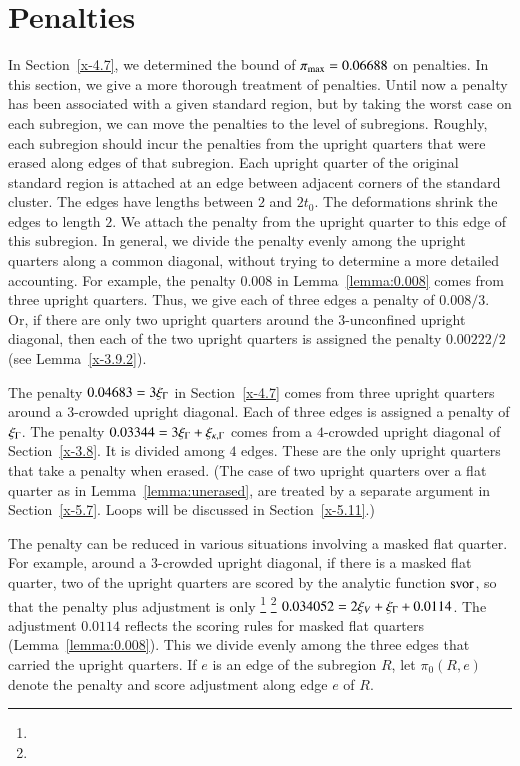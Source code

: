 \section{Penalties} %
    \label{sec:penalty1}

In Section~\ref{x-4.7}, we determined the bound of
$\pi_{\max}=0.06688$ on penalties. In this section, we give a more
thorough treatment of penalties. Until now a penalty has been
associated with a given standard region, but by taking the worst
case on each subregion, we can move the penalties to the level of
subregions.   Roughly, each subregion should incur the penalties
from the upright quarters that were erased along edges of that
subregion.  Each upright quarter of the original standard region
is attached at an edge between adjacent corners of the standard
cluster. The edges have lengths between $2$ and $2t_0$.  The
deformations shrink the edges to length $2$.  We attach the
penalty from the upright quarter to this edge of this subregion.
In general, we divide the penalty evenly among the upright
quarters along a common diagonal, without trying to determine a
more detailed accounting. For example, the penalty $0.008$ in
Lemma~\ref{lemma:0.008} comes from three upright quarters.  Thus,
we give each of three edges a penalty of $0.008/3$. Or, if there
are only two upright quarters around the $3$-unconfined upright
diagonal, then each of the two upright quarters is assigned the
penalty $0.00222/2$ (see Lemma~\ref{x-3.9.2}).

The penalty $0.04683 = 3\xi_\Gamma$ in Section~\ref{x-4.7} comes from
three upright quarters around a $3$-crowded upright diagonal. Each
of three edges is assigned a penalty of $\xi_\Gamma$.  The penalty
$0.03344=3\xi_\Gamma+\xi_{\kappa,\Gamma}$ comes from a $4$-crowded upright diagonal of
Section~\ref{x-3.8}. It is divided among $4$ edges. These are the
only upright quarters that take a penalty when erased. (The case
of two upright quarters over a flat quarter as in
Lemma~\ref{lemma:unerased}, are treated by a separate argument in
Section~\ref{x-5.7}. Loops will be discussed in
Section~\ref{x-5.11}.)

The penalty can be reduced in various situations involving a
masked flat quarter.  For example, around a $3$-crowded upright
diagonal, if there is a masked flat quarter, two of the upright
quarters are scored by the analytic  function $\operatorname{svor}$, so that the
penalty plus adjustment is only%
\footnote{} %
\footnote{} %
 $0.034052=2\xi_V+\xi_\Gamma+0.0114$.
The adjustment $0.0114$ reflects the scoring
rules for masked flat quarters (Lemma~\ref{lemma:0.008}).  This we
divide evenly among the three edges that carried the upright
quarters. If $e$ is an edge of the subregion $R$, let $\pi_0(R,e)$
denote the penalty and score adjustment along edge $e$ of $R$.

